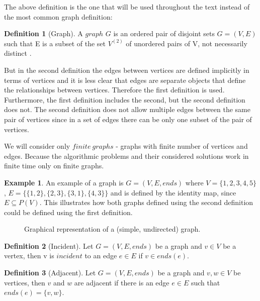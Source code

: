 \documentclass{report}
\theoremstyle{plain}
\theoremstyle{definition}
\newtheorem{definition}{Definition}
\newtheorem{example}{Example}
\theoremstyle{remark}
\numberwithin{definition}{chapter}
\numberwithin{example}{chapter}
\numberwithin{figure}{chapter}
\begin{document}
The above definition is the one that will be used throughout the text instead of the most common graph definition:

\begin{definition}[Graph]
A $graph$  $G$ is an ordered pair of disjoint sets $G = (V, E)$ such that E is a subset of the set $V^{(2)}$ of unordered pairs of V, not necessarily distinct \cite{bollobas1998modern}. 
\end{definition} 

But in the second definition the edges between vertices are defined implicitly in terms of vertices and it is less clear that edges are separate objects that define the relationships between vertices. Therefore the first definition is used. Furthermore, the first definition includes the second, but the second definition does not. The second definition does not allow multiple edges between the same pair of vertices since in a set of edges there can be only one subset of the pair of vertices.

We will consider only $finite \ graphs$ - graphs with finite number of vertices and edges. Because the algorithmic problems and their considered solutions work in finite time only on finite graphs.

\begin{example}
An example of a graph is $G=(V, E, ends)$ where $V=\{1,2,3,4,5\}$, $E=\{\{1,2\}, \{2,3\}, \{3,1\}, \{4,3\}\}$ and is defined by the identity map, since $E \subseteq P(V)$. This illustrates how both graphs defined using the second definition could be defined using the first definition.

\begin{figure}[h]
\center
{}
\caption{Graphical representation of a (simple, undirected) graph.}
\end{figure}
\end{example}

\begin{definition}[Incident]
Let $G = (V, E, ends)$ be a graph and $v\in V$ be a vertex, then v is $incident$ to an edge $e \in E$ if $v \in ends(e)$.
\end{definition}

\begin{definition}[Adjacent]
Let $G = (V, E, ends)$ be a graph and $v,w\in V$ be vertices, then $v$ and $w$ are adjacent if there is an edge $ e \in E$ such that $ends(e) = \{v, w\}$.
\end{definition}
\end{document}
